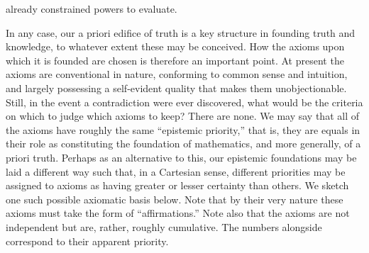 \documentclass[pra,twocolumn,groupedaddress,10pt]{revtex4}
\theoremstyle{definition}
\begin{document}
already constrained powers to evaluate.

In any case, our a priori edifice of truth is a key structure in founding truth and knowledge, to whatever extent these may be conceived. How the axioms upon which it is founded are chosen is therefore an important point. At present the axioms are conventional in nature, conforming to common sense and intuition, and largely possessing a self-evident quality that makes them unobjectionable. Still, in the event a contradiction were ever discovered, what would be the criteria on which to judge which axioms to keep? There are none. We may say that all of the axioms have roughly the same ``epistemic priority,'' that is, they are equals in their role as constituting the foundation of mathematics, and more generally, of a priori truth. Perhaps as an alternative to this, our epistemic foundations may be laid a different way such that, in a Cartesian sense, different priorities may be assigned to axioms as having greater or lesser certainty than others. We sketch one such possible axiomatic basis below. Note that by their very nature these axioms must take the form of ``affirmations.'' Note also that the axioms are not independent but are, rather, roughly cumulative. The numbers alongside correspond to their apparent priority.
\end{document}
